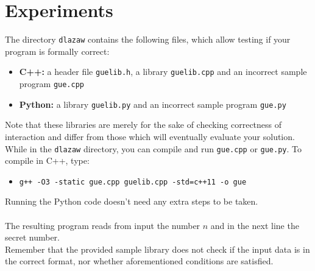 \documentclass[en]{spiral}
\begin{document}
\section{Experiments}
    The directory \texttt{dlazaw} contains the following files,
    which allow testing if your program is formally correct:
    \begin{itemize}
        \item \textbf{C++:} a header file \texttt{guelib.h},
            a library \texttt{guelib.cpp} and an incorrect sample program
            \texttt{gue.cpp}
        \item \textbf{Python:} a library \texttt{guelib.py} and
            an incorrect sample program \texttt{gue.py}
    \end{itemize}

    \noindent Note that these libraries are merely for the sake of checking
    correctness of interaction and differ from those which will eventually
    evaluate your solution.
    While in the \texttt{dlazaw} directory,
    you can compile and run \texttt{gue.cpp} or \texttt{gue.py}.
    To compile in C++, type:

    \begin{itemize}
        \item \texttt{g++ -O3 -static gue.cpp guelib.cpp -std=c++11 -o gue}
    \end{itemize}

    \noindent Running the Python code doesn't need any extra steps to be taken.\\
    \\
    The resulting program reads from input the number $n$
    and in the next line the secret number.
    \\
    Remember that the provided sample library does not check
    if the input data is in the correct format,
    nor whether aforementioned conditions are satisfied.
\end{document}

